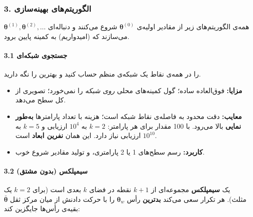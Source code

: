\subsubsection{3. الگوریتم‌های بهینه‌سازی}

همه‌ی الگوریتم‌های زیر از مقادیر اولیه‌ی \(\boldsymbol\theta^{(0)}\) شروع
می‌کنند و دنباله‌ای
\(\boldsymbol\theta^{(1)},\allowbreak \boldsymbol\theta^{(2)},\allowbreak \dots\) می‌سازند که
(امیدواریم) به کمینه پایین برود.

\paragraph{\texorpdfstring{3.1 جستجوی شبکه‌ای }{3.1 جستجوی شبکه‌ای (grid search)}}

 را در همه‌ی نقاط یک شبکه‌ی منظم حساب کنید و بهترین را نگه دارید.

\begin{itemize}
\tightlist
\item
  \textbf{مزایا:} فوق‌العاده ساده؛ گول کمینه‌های محلی \emph{روی شبکه} را
  نمی‌خورد؛ تصویری از کل سطح می‌دهد.
\item
  \textbf{معایب:} دقت محدود به فاصله‌ی نقاط شبکه است؛ هزینه با تعداد
  پارامترها \textbf{به‌طور نمایی} بالا می‌رود. با 100 مقدار برای هر
  پارامتر: \(k = 2\) به \(10^4\) ارزیابی و \(k = 5\) به \(10^{10}\)
  ارزیابی نیاز دارد. این همان \textbf{نفرین ابعاد}  است.
\item
  \textbf{کاربرد:} رسم سطح‌های 1 یا 2 پارامتری، و تولید مقادیر شروع خوب.
\end{itemize}

\paragraph{\texorpdfstring{3.2 سیمپلکس  (بدون
مشتق)}{3.2 سیمپلکس Nelder\lr{--}Mead (بدون مشتق)}}

یک \textbf{سیمپلکس} مجموعه‌ای از \(k+1\) نقطه در فضای \(k\) بعدی است
(برای \(k = 2\) یک مثلث). هر تکرار سعی می‌کند \textbf{بدترین} رأس
\(\boldsymbol\theta_w\) را با حرکت دادنش از میان مرکز ثقل
\(\bar{\boldsymbol\theta}\) بقیه‌ی رأس‌ها جایگزین کند:

